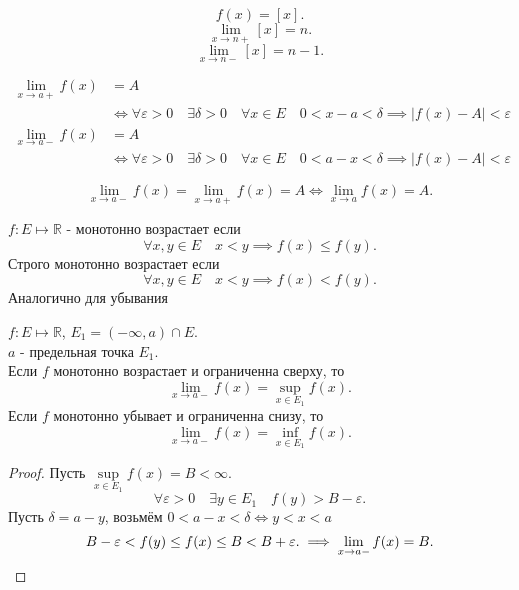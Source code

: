 \documentclass[11pt, oneside]{article}   	%
\begin{document}
    \begin{example}
        \[ f(x) = \left[x\right] .\]
        \[ \lim\limits_{x \to n+} \left[x\right] = n.\]
        \[ \lim\limits_{x \to n-} \left[x\right] = n - 1.\] 
    \end{example}
    \begin{dlemma}
        \begin{equation*}
            \begin{split}
                \lim\limits_{x \to a+} f(x) &= A\\
                &\iff \forall{\varepsilon>0}\quad \exists{\delta > 0}\quad \forall{x\in E}\quad 0<x-a<\delta \implies |f(x) - A| < \varepsilon 
            \end{split} 
        \end{equation*}
        \begin{equation*}
            \begin{split}
                \lim\limits_{x \to a-} f(x) &= A\\
                &\iff \forall{\varepsilon>0}\quad \exists{\delta > 0}\quad \forall{x\in E}\quad 0<a-x<\delta \implies |f(x) - A| < \varepsilon 
            \end{split} 
        \end{equation*}
    \end{dlemma}
    \begin{dlemma}
        \[ \lim\limits_{x \to a-} f(x) = \lim\limits_{x \to a+} f(x) = A \iff \lim\limits_{x \to a} f(x) = A .\] 
    \end{dlemma}
    \begin{definition}
        $f: E \mapsto \mathbb{R}$ - монотонно возрастает если
        \[ \forall{x, y\in E}\quad x<y \implies f(x) \le  f(y) .\]
        Строго монотонно возрастает если
        \[ \forall{x,y\in E}\quad x<y \implies f(x) < f(y)  .\]
        Аналогично для убывания
    \end{definition}
    \begin{dlemma}
        $f: E \mapsto \mathbb{R}$, $E_1 = \left( -\infty, a \right)\cap E$.\\
        $a$ - предельная точка $ E_1$.\\
        Если $f$ монотонно возрастает и ограниченна сверху, то 
        \[ \lim\limits_{x \to a-} f(x) = \sup\limits_{x\in E_1} f(x) .\]
        Если $f$ монотонно убывает и ограниченна снизу, то
        \[ \lim\limits_{x \to a-} f(x) = \inf\limits_{x\in E_1} f(x)  .\]
        \begin{proof}
            Пусть $\sup\limits_{x\in E_1} f(x) = B < \infty$.\\
            \[ \forall{\varepsilon>0}\quad \exists{y\in E_1}\quad f(y)>B-\varepsilon .\]
            Пусть $\delta = a-y$, возьмём $0<a-x<\delta \iff y<x<a$\\
            \[ B-\varepsilon < f(y) \le f(x) \le B < B+\varepsilon. \implies \lim\limits_{x \to a-} f(x) = B.\qedhere\]
        \end{proof}
    \end{dlemma}
\end{document}
